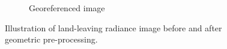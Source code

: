 \begin{figure}[thb]
\begin{subfigure}[t]{.52\linewidth}
		\caption{Georeferenced image}		
		\label{fig:QuartzByTASI}
	\end{subfigure}
	\vspace{1.5 em}
	\caption{Illustration of land-leaving radiance image before and after geometric pre-processing.}
	\label{fig:Georeferencing}
\end{figure}


